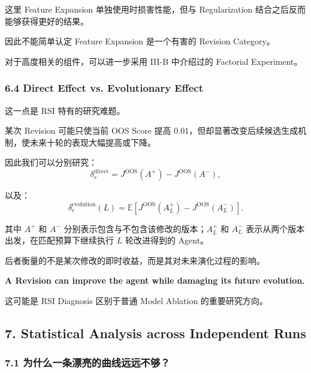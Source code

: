这里 Feature Expansion 单独使用时损害性能，但与 Regularization 结合之后反而能够获得更好的结果。

因此不能简单认定 Feature Expansion 是一个有害的 Revision Category。

对于高度相关的组件，可以进一步采用 III-B 中介绍过的 Factorial Experiment。

\hypertarget{part-3-48-0001-direct-effect-vs.-evolutionary-effect}{%
\subsubsection{6.4 Direct Effect vs. Evolutionary Effect}\label{part-3-48-0001-direct-effect-vs.-evolutionary-effect}}

这一点是 RSI 特有的研究难题。

某次 Revision 可能只使当前 OOS Score 提高 0.01，但却显著改变后续候选生成机制，使未来十轮的表现大幅提高或下降。

因此我们可以分别研究：
\[\delta_r^{\mathrm{direct}}
=
J^{\mathrm{OOS}}(A^+)
-
J^{\mathrm{OOS}}(A^-),\]

以及：
\[\boxed{
\delta_r^{\mathrm{evolution}}(L)
=
\mathbb E\left[
J^{\mathrm{OOS}}(A_L^+)
-
J^{\mathrm{OOS}}(A_L^-)
\right].
}\]

其中 \(A^+\) 和 \(A^-\) 分别表示包含与不包含该修改的版本；\(A_L^+\) 和 \(A_L^-\) 表示从两个版本出发，在匹配预算下继续执行 \(L\) 轮改进得到的 Agent。

后者衡量的不是某次修改的即时收益，而是其对未来演化过程的影响。

\textbf{A Revision can improve the agent while damaging its future evolution.}

这可能是 RSI Diagnosis 区别于普通 Model Ablation 的重要研究方向。

\hypertarget{part-3-48-0001-statistical-analysis-across-independent-runs}{%
\subsection{7. Statistical Analysis across Independent Runs}\label{part-3-48-0001-statistical-analysis-across-independent-runs}}

\hypertarget{part-3-48-0001-ux4e3aux4ec0ux4e48ux4e00ux6761ux6f02ux4eaeux7684ux66f2ux7ebfux8fdcux8fdcux4e0dux591f}{%
\subsubsection{7.1 为什么一条漂亮的曲线远远不够？}\label{part-3-48-0001-ux4e3aux4ec0ux4e48ux4e00ux6761ux6f02ux4eaeux7684ux66f2ux7ebfux8fdcux8fdcux4e0dux591f}}

